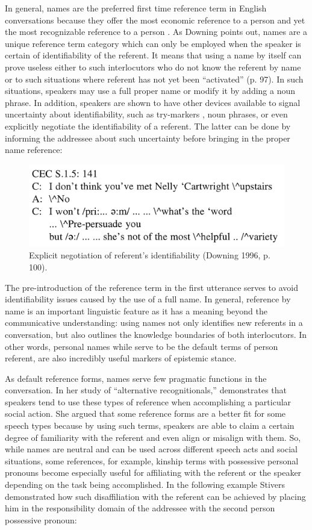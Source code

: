 \documentclass[12pt, draft]{article}
\begin{document}
In general, names are the preferred first time reference term in English conversations because they offer the most economic reference to a person and yet the most recognizable reference to a person \parencite{downing1996}. As Downing points out, names are a unique reference term category which can only be employed when the speaker is certain of identifiability of the referent. It means that using a name by itself can prove useless either to such interlocutors who do not know the referent by name or to such situations where referent has not yet been ``activated'' (p. 97). In such situations, speakers may use a full proper name or modify it by adding a noun phrase. In addition, speakers are shown to have other devices available to signal uncertainty about identifiability, such as try-markers \parencite{sacks1979}, noun phrases, or even explicitly negotiate the identifiability of a referent. The latter can be done by informing the addressee about such uncertainty before bringing in the proper name reference:

\begin{figure}
\caption{Explicit negotiation of referent's identifiability (Downing 1996, p. 100).}
\label{Downing}
\includegraphics[width=5in]{Downing.png}
\end{figure}

The pre-introduction of the reference term in the first utterance serves to avoid identifiability issues caused by the use of a full name. In general, reference by name is an important linguistic feature as it has a meaning beyond the communicative understanding: using names not only identifies new referents in a conversation, but also outlines the knowledge boundaries of both interlocutors. In other words, personal names while serve to be the default terms of person referent, are also incredibly useful markers of epistemic stance.

As default reference forms, names serve few pragmatic functions in the conversation. In her study of ``alternative recognitionals,'' \textcite{stivers2007} demonstrates that speakers tend to use these types of reference when accomplishing a particular social action. She argued that some reference forms are a better fit for some speech types because by using such terms, speakers are able to claim a certain degree of familiarity with the referent and even align or misalign with them. So, while names are neutral and can be used across different speech acts and social situations, some references, for example, kinship terms with possessive personal pronouns become especially useful for affiliating with the referent or the speaker depending on the task being accomplished. In the following example Stivers demonstrated how such disaffiliation with the referent can be achieved by placing him in the responsibility domain of the addressee with the second person possessive pronoun:
\end{document}
